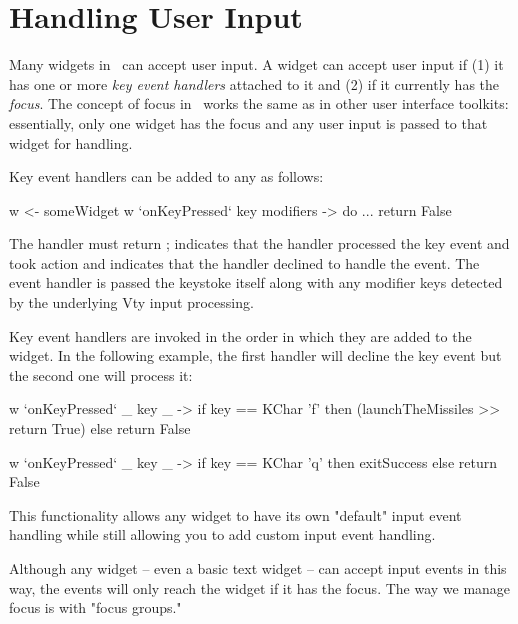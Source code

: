 \section{Handling User Input}

Many widgets in \vtyui\ can accept user input.  A widget can accept
user input if (1) it has one or more \textit{key event handlers}
attached to it and (2) if it currently has the \textit{focus}.  The
concept of focus in \vtyui\ works the same as in other user interface
toolkits: essentially, only one widget has the focus and any user
input is passed to that widget for handling.

Key event handlers can be added to any  as follows:

\begin{haskellcode}
 w <- someWidget
 w `onKeyPressed` \this key modifiers -> do
   ...
   return False
\end{haskellcode}

The handler must return ;  indicates that the
handler processed the key event and took action and 
indicates that the handler declined to handle the event.  The event
handler is passed the keystoke itself along with any modifier keys
detected by the underlying Vty input processing.

Key event handlers are invoked in the order in which they are added to
the widget.  In the following example, the first handler will decline
the  key event but the second one will process it:

\begin{haskellcode}
 w `onKeyPressed` \_ key _ ->
   if key == KChar 'f' then
     (launchTheMissiles >> return True) else
     return False

 w `onKeyPressed` \_ key _ ->
   if key == KChar 'q' then
     exitSuccess else return False
\end{haskellcode}

This functionality allows any widget to have its own "default" input
event handling while still allowing you to add custom input event
handling.

Although any widget -- even a basic text widget -- can accept input
events in this way, the events will only reach the widget if it has the
focus.  The way we manage focus is with "focus groups."
